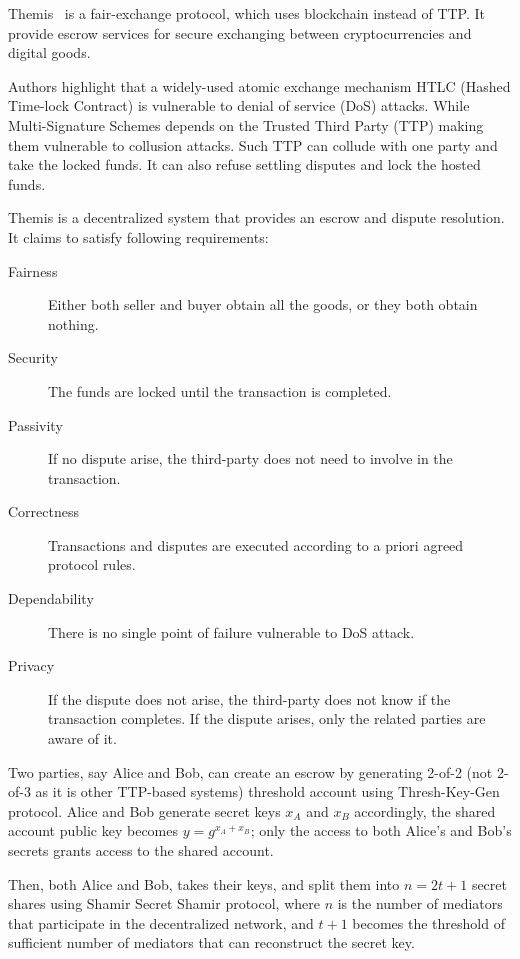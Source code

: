\documentclass{article}
\begin{document}
Themis~\cite{meng2019themis} is a fair-exchange protocol, which uses blockchain instead of TTP. It provide escrow services for secure exchanging between cryptocurrencies and digital goods.

Authors highlight that a widely-used atomic exchange mechanism HTLC (Hashed Time-lock Contract) is vulnerable to denial of service (DoS) attacks. While Multi-Signature Schemes depends on the Trusted Third Party (TTP) making them vulnerable to collusion attacks. Such TTP can collude with one party and take the locked funds. It can also refuse settling disputes and lock the hosted funds. 

Themis is a decentralized system that provides an escrow and dispute resolution. It claims to satisfy following requirements:
\begin{description}
    \item[Fairness] Either both seller and buyer obtain all the goods, or they both obtain nothing.
    \item[Security] The funds are locked until the transaction is completed.
    \item[Passivity] If no dispute arise, the third-party does not need to involve in the transaction.
    \item[Correctness] Transactions and disputes are executed according to a priori agreed protocol rules.
    \item[Dependability] There is no single point of failure vulnerable to DoS attack.
    \item[Privacy] If the dispute does not arise, the third-party does not know if the transaction completes. If the dispute arises, only the related parties are aware of it.    
\end{description}

Two parties, say Alice and Bob, can create an escrow by generating 2-of-2 (not 2-of-3 as it is other TTP-based systems) threshold account using Thresh-Key-Gen protocol. Alice and Bob generate secret keys $x_A$ and $x_B$ accordingly, the shared account public key becomes $y = g^{x_A+x_B}$; only the access to both Alice's and Bob's secrets grants access to the shared account.

Then, both Alice and Bob, takes their keys, and split them into $n=2t+1$ secret shares using Shamir Secret Shamir protocol, where $n$ is the number of mediators that participate in the decentralized network, and $t+1$ becomes the threshold of sufficient number of mediators that can reconstruct the secret key. 
\end{document}
